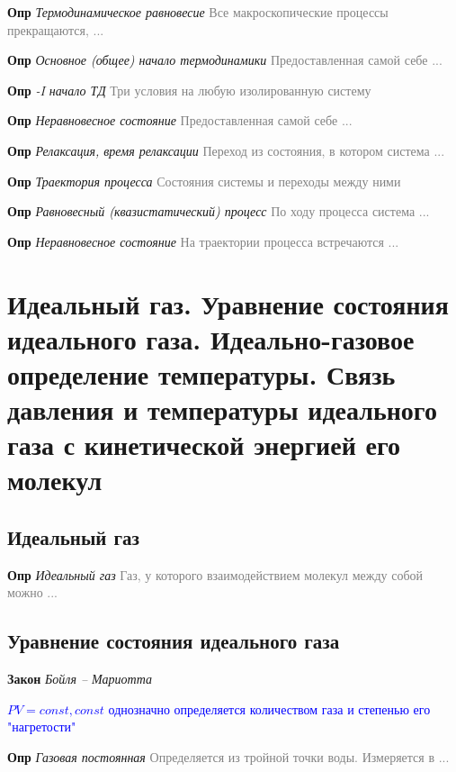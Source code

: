 \documentclass[a4paper, 14pt]{article}
\begin{document}
    \textbf{Опр} \textit{Термодинамическое равновесие} \textcolor{gray}{Все макроскопические процессы прекращаются, ...}

    \textbf{Опр} \textit{Основное (общее) начало термодинамики} \textcolor{gray}{Предоставленная самой себе ...}

    \textbf{Опр} \textit{-I начало ТД} \textcolor{gray}{Три условия на любую изолированную систему}

    \textbf{Опр} \textit{Неравновесное состояние} \textcolor{gray}{Предоставленная самой себе ...}

    \textbf{Опр} \textit{Релаксация, время релаксации} \textcolor{gray}{Переход из состояния, в котором система ...}

    \textbf{Опр} \textit{Траектория процесса} \textcolor{gray}{Состояния системы и переходы между ними}

    \textbf{Опр} \textit{Равновесный (квазистатический) процесс} \textcolor{gray}{По ходу процесса система ...}

    \textbf{Опр} \textit{Неравновесное состояние} \textcolor{gray}{На траектории процесса встречаются ...}

    \section{Идеальный газ.
    Уравнение состояния идеального газа.
    Идеально-газовое определение температуры.
    Связь давления и температуры идеального газа с кинетической энергией его молекул}

    \subsection{Идеальный газ}

    \textbf{Опр} \textit{Идеальный газ} \textcolor{gray}{Газ, у которого взаимодействием молекул между собой можно ...}

    \subsection{Уравнение состояния идеального газа}

    \textbf{Закон} \textit{Бойля -- Мариотта}

    \textcolor{blue}{$PV = const, const$ однозначно определяется количеством газа и степенью его "нагретости"}

    \textbf{Опр} \textit{Газовая постоянная} \textcolor{gray}{Определяется из тройной точки воды. Измеряется в ...}
\end{document}
